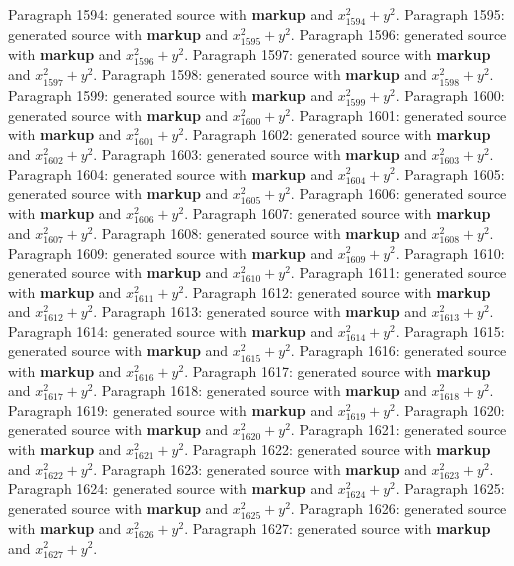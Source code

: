 \documentclass{article}
\begin{document}
Paragraph 1594: generated source with \textbf{markup} and $x_{1594}^2 + y^2$.
Paragraph 1595: generated source with \textbf{markup} and $x_{1595}^2 + y^2$.
Paragraph 1596: generated source with \textbf{markup} and $x_{1596}^2 + y^2$.
Paragraph 1597: generated source with \textbf{markup} and $x_{1597}^2 + y^2$.
Paragraph 1598: generated source with \textbf{markup} and $x_{1598}^2 + y^2$.
Paragraph 1599: generated source with \textbf{markup} and $x_{1599}^2 + y^2$.
Paragraph 1600: generated source with \textbf{markup} and $x_{1600}^2 + y^2$.
Paragraph 1601: generated source with \textbf{markup} and $x_{1601}^2 + y^2$.
Paragraph 1602: generated source with \textbf{markup} and $x_{1602}^2 + y^2$.
Paragraph 1603: generated source with \textbf{markup} and $x_{1603}^2 + y^2$.
Paragraph 1604: generated source with \textbf{markup} and $x_{1604}^2 + y^2$.
Paragraph 1605: generated source with \textbf{markup} and $x_{1605}^2 + y^2$.
Paragraph 1606: generated source with \textbf{markup} and $x_{1606}^2 + y^2$.
Paragraph 1607: generated source with \textbf{markup} and $x_{1607}^2 + y^2$.
Paragraph 1608: generated source with \textbf{markup} and $x_{1608}^2 + y^2$.
Paragraph 1609: generated source with \textbf{markup} and $x_{1609}^2 + y^2$.
Paragraph 1610: generated source with \textbf{markup} and $x_{1610}^2 + y^2$.
Paragraph 1611: generated source with \textbf{markup} and $x_{1611}^2 + y^2$.
Paragraph 1612: generated source with \textbf{markup} and $x_{1612}^2 + y^2$.
Paragraph 1613: generated source with \textbf{markup} and $x_{1613}^2 + y^2$.
Paragraph 1614: generated source with \textbf{markup} and $x_{1614}^2 + y^2$.
Paragraph 1615: generated source with \textbf{markup} and $x_{1615}^2 + y^2$.
Paragraph 1616: generated source with \textbf{markup} and $x_{1616}^2 + y^2$.
Paragraph 1617: generated source with \textbf{markup} and $x_{1617}^2 + y^2$.
Paragraph 1618: generated source with \textbf{markup} and $x_{1618}^2 + y^2$.
Paragraph 1619: generated source with \textbf{markup} and $x_{1619}^2 + y^2$.
Paragraph 1620: generated source with \textbf{markup} and $x_{1620}^2 + y^2$.
Paragraph 1621: generated source with \textbf{markup} and $x_{1621}^2 + y^2$.
Paragraph 1622: generated source with \textbf{markup} and $x_{1622}^2 + y^2$.
Paragraph 1623: generated source with \textbf{markup} and $x_{1623}^2 + y^2$.
Paragraph 1624: generated source with \textbf{markup} and $x_{1624}^2 + y^2$.
Paragraph 1625: generated source with \textbf{markup} and $x_{1625}^2 + y^2$.
Paragraph 1626: generated source with \textbf{markup} and $x_{1626}^2 + y^2$.
Paragraph 1627: generated source with \textbf{markup} and $x_{1627}^2 + y^2$.
\end{document}
